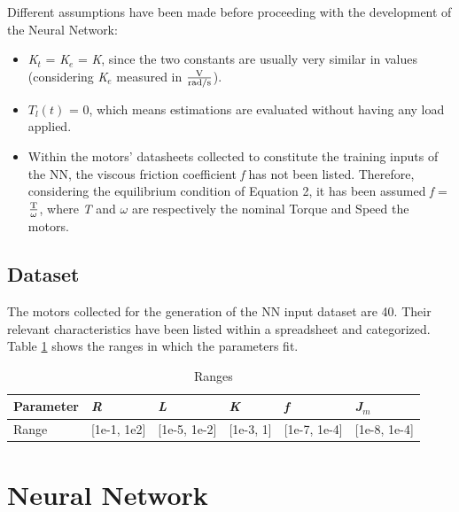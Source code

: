 Different assumptions have been made before proceeding with the development of the Neural Network:

\begin{itemize}
 \item \textit{K$_{t}$} = \textit{K$_{e}$} = \textit{K}, since the two constants are usually very similar in values (considering \textit{K$_{e}$} measured in $\frac{\text{V}}{\text{rad/s}} $).
 \item \textit{$T_l(t)$} = 0, which means estimations are evaluated without having any load applied.
 \item Within the motors' datasheets collected to constitute the training inputs of the NN, the viscous friction coefficient \textit{f} has not been listed. Therefore, considering the equilibrium condition of Equation 2, it has been assumed \textit{f} = $\frac{\text{T}}{\text{$\omega$}}$, where \textit{T} and $\omega$ are respectively the nominal Torque and Speed the motors.
\end{itemize}


\subsection{Dataset}

The motors collected for the generation of the NN input dataset are 40. Their relevant characteristics have been listed within a spreadsheet and categorized.
Table \ref{table:ranges} shows the ranges in which the parameters fit.

\begin{table}[h!] %
\centering	
\renewcommand{\arraystretch}{1.5}  
\begin{tabular}{| l || l l l l l |} 
 \hline
 Parameter & \textit{R} & \textit{L} & \textit{K} & \textit{f} & \textit{J$_{m}$}\\ [0.5ex]  
 \hline
 Range & [1e-1, 1e2] & [1e-5, 1e-2] & [1e-3, 1] & [1e-7, 1e-4] & [1e-8, 1e-4]\\
 \hline
\end{tabular}
\caption{Ranges}
\label{table:ranges}
\end{table}


\section{\textbf{Neural Network}}

